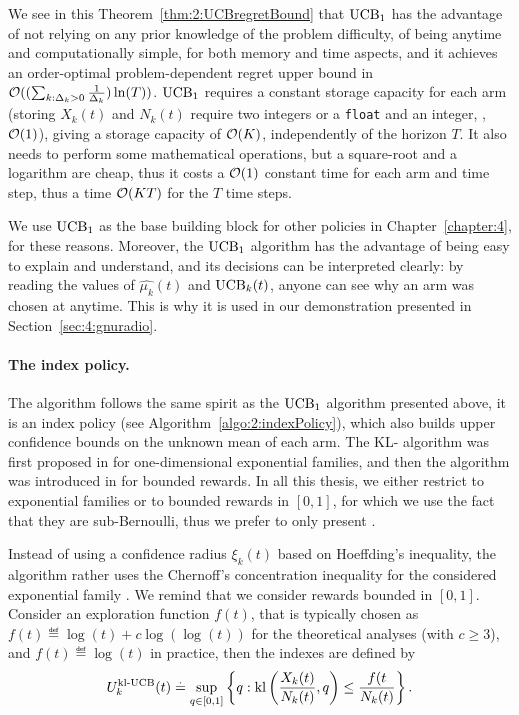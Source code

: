 We see in this Theorem~\ref{thm:2:UCBregretBound} that $\mathrm{UCB}_1$ has the advantage of not relying on any prior knowledge of the problem difficulty, of being anytime and computationally simple, for both memory and time aspects, and it achieves an order-optimal problem-dependent regret upper bound in $\mathcal{O}((\sum_{k: \Delta_k>0} \frac{1}{\Delta_k})\ln(T))$.
%
$\mathrm{UCB}_1$ requires a constant storage capacity for each arm (storing $X_k(t)$ and $N_k(t)$ require two integers or a \texttt{float} and an integer, \ie, $\mathop{}\mathopen{}\mathcal{O}\mathopen{}\left(1\right)$), giving a storage capacity of $\mathop{}\mathopen{}\mathcal{O}\mathopen{}\left(K\right)$, independently of the horizon $T$.
It also needs to perform some mathematical operations, but a square-root and a logarithm are cheap, thus it costs a $\mathop{}\mathopen{}\mathcal{O}\mathopen{}\left(1\right)$ constant time for each arm and time step, thus a time $\mathop{}\mathopen{}\mathcal{O}\mathopen{}\left(K T\right)$ for the $T$ time steps.

We use $\mathrm{UCB}_1$ as the base building block for other policies in Chapter~\ref{chapter:4}, for these reasons.
Moreover, the $\mathrm{UCB}_1$ algorithm has the advantage of being easy to explain and understand, and its decisions can be interpreted clearly: by reading the values of $\widehat{\mu_k}(t)$ and $\mathrm{UCB}_k(t)$, anyone can see why an arm was chosen at anytime.
This is why it is used in our demonstration presented in Section~\ref{sec:4:gnuradio}.


\paragraph{The \klUCB{} index policy.}
%
The \klUCB{} algorithm follows the same spirit as the $\mathrm{UCB}_1$ algorithm presented above,
it is an index policy (see Algorithm~\ref{algo:2:indexPolicy}),
which also builds upper confidence bounds on the unknown mean of each arm.
The KL-\UCB{} algorithm was first proposed in \cite{Garivier11KL} for one-dimensional exponential families,
and then the \klUCB{} algorithm was introduced in \cite{KLUCBJournal} for bounded rewards.
In all this thesis, we either restrict to exponential families or to bounded rewards in $[0,1]$, for which we use the fact that they are sub-Bernoulli, thus we prefer to only present \klUCB.

Instead of using a confidence radius $\xi_k(t)$ based on Hoeffding's inequality,
the \klUCB{} algorithm rather uses the Chernoff's concentration inequality for the considered exponential family \cite{chernoff1952measure,chernoff1981note}.
We remind that we consider rewards bounded in $[0,1]$.
Consider an exploration function $f(t)$,
that is typically chosen as $f(t) \eqdef \log(t)+c\log(\log(t))$ for the theoretical analyses (with $c \geq 3$),
and $f(t) \eqdef \log(t)$ in practice,
then the \klUCB{} indexes are defined by
\begin{align}\label{eq:2:klUCB_index}
    U_k^{\mathrm{kl}\text{-}\mathrm{UCB}}(t) \overset{.}{=} \sup\limits_{q \in [0, 1]} \left\{ q : \mathrm{kl}\left(\frac{X_k(t)}{N_k(t)}, q\right) \leq \frac{f(t}{N_k(t)} \right\}.
\end{align}

